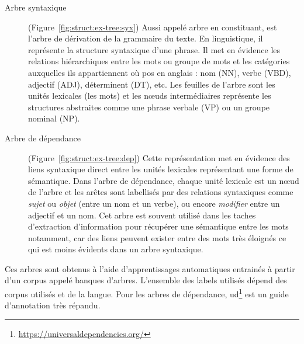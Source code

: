 \begin{description}
    \item[Arbre syntaxique]
          (Figure~\ref{fig:struct:ex-tree:syx})
          Aussi appelé arbre en constituant, est l'arbre de dérivation de la grammaire du texte.
          En linguistique, il représente la structure syntaxique d'une phrase.
          Il met en évidence les relations hiérarchiques entre les mots ou groupe de mots et les catégories auxquelles ils appartiennent où \gls{pos} en anglais : nom (NN), verbe (VBD), adjectif (ADJ), déterminent (DT), etc.
          Les feuilles de l'arbre sont les unités lexicales (les mots) et les nœuds intermédiaires représente les structures abstraites comme une phrase verbale (VP) ou un groupe nominal (NP).

    \item[Arbre de dépendance]
          (Figure~\ref{fig:struct:ex-tree:dep})
          Cette représentation met en évidence des liens syntaxique direct entre les unités lexicales représentant une forme de sémantique.
          Dans l'arbre de dépendance, chaque unité lexicale est un nœud de l'arbre et les arêtes sont labellisés par des relations syntaxiques comme \emph{sujet} ou \emph{objet} (entre un nom et un verbe), ou encore \emph{modifier} entre un adjectif et un nom.
          Cet arbre est souvent utilisé dans les taches d'extraction d'information pour récupérer une sémantique entre les mots notamment, car des liens peuvent exister entre des mots très éloignés ce qui est moins évidents dans un arbre syntaxique.
\end{description}

Ces arbres sont obtenus à l'aide d'apprentissages automatiques entrainés à partir d'un corpus appelé banques d'arbres.
L'ensemble des labels utilisés dépend des corpus utilisés et de la langue.
Pour les arbres de dépendance, \gls{ud}\footnote{\url{https://universaldependencies.org/}} est un guide d'annotation très répandu.

